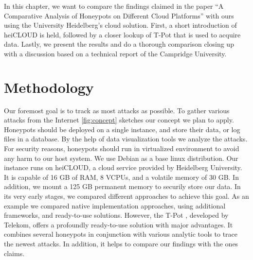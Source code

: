 In this chapter, we want to compare the findings \citet{Kelly2021} claimed in the paper \enquote{A Comparative Analysis of Honeypots on Different
    Cloud Platforms} with ours using the University Heidelberg's cloud solution.
First, a short introduction of heiCLOUD is held, followed by a closer lookup of T-Pot that is used to acquire data.
Lastly, we present the results and do a thorough comparison closing up with a discussion based on a technical report of the Campridge University.

\section{Methodology}

Our foremost goal is to track as most attacks as possible.
To gather various attacks from the Internet \autoref{fig:concept} sketches our concept we plan to apply.
Honeypots should be deployed on a single instance, and store their data, or log files in a database.
By the help of data visualization tools we analyze the attacks.
For security reasons, honeypots should run in virtualized environment to avoid any harm to our host system.
We use Debian as a base linux distribution.
Our instance runs on heiCLOUD, a cloud service provided by Heidelberg University.
It is capable of 16 GB of RAM, 8 VCPUs, and a volatile memory of 30 GB.
In addition, we mount a 125 GB permanent memory to securily store our data.
In its very early stages, we compared different approaches to achieve this goal.
As an example we compared native implementation approaches, using additional frameworks, and ready-to-use solutions.
However, the T-Pot , developed by Telekom, offers a profoundly ready-to-use solution with major advantages.
It combines several honeypots in conjunction with various analytic tools to trace the newest attacks.
In addition, it helps to compare our findings with the ones \citet{Kelly2021} claims.

